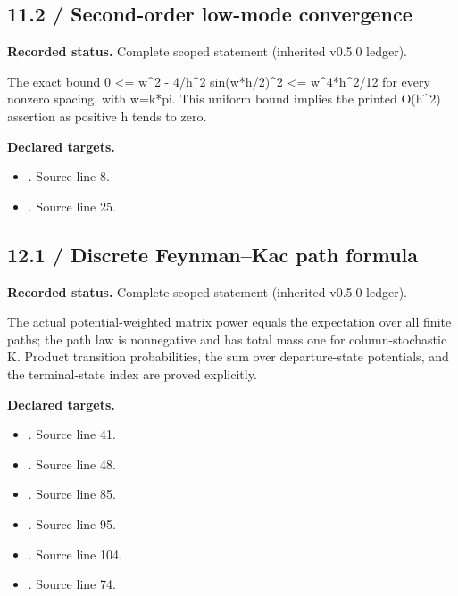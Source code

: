 \subsection{11.2 / Second-order low-mode convergence}
\label{result:11.2}
\textbf{Recorded status.} Complete scoped statement (inherited v0.5.0 ledger).\par
The exact bound 0 <= w\textasciicircum{}2 - 4/h\textasciicircum{}2 sin(w*h/2)\textasciicircum{}2 <= w\textasciicircum{}4*h\textasciicircum{}2/12 for every nonzero spacing, with w=k*pi. This uniform bound implies the printed O(h\textasciicircum{}2) assertion as positive h tends to zero.

\textbf{Declared targets.}\begin{itemize}
\item {}. Source line 8.
\item {}. Source line 25.
\end{itemize}
\subsection{12.1 / Discrete Feynman--Kac path formula}
\label{result:12.1}
\textbf{Recorded status.} Complete scoped statement (inherited v0.5.0 ledger).\par
The actual potential-weighted matrix power equals the expectation over all finite paths; the path law is nonnegative and has total mass one for column-stochastic K. Product transition probabilities, the sum over departure-state potentials, and the terminal-state index are proved explicitly.

\textbf{Declared targets.}\begin{itemize}
\item {}. Source line 41.
\item {}. Source line 48.
\item {}. Source line 85.
\item {}. Source line 95.
\item {}. Source line 104.
\item {}. Source line 74.
\end{itemize}
